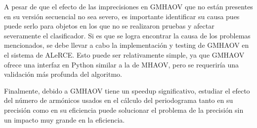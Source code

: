 A pesar de que el efecto de las imprecisiones en GMHAOV que no están presentes en su versión secuencial no sea severo, es importante identificar su causa pues puede serlo para objetos en los que no se realizaron pruebas y afectar severamente el clasificador. Si es que se logra encontrar la causa de los problemas mencionados, se debe llevar a cabo la implementación y testing de GMHAOV en el sistema de ALeRCE. Esto puede ser relativamente simple, ya que GMHAOV ofrece una interfaz en Python similar a la de MHAOV, pero se requeriría una validación más profunda del algoritmo.

Finalmente, debido a GMHAOV tiene un speedup significativo, estudiar el efecto del número de armónicos usados en el cálculo del periodograma tanto en su precisión como en su eficiencia puede solucionar el problema de la precisión sin un impacto muy grande en la eficiencia.


